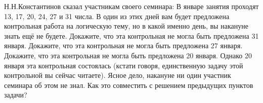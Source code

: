 \documentclass[12pt]{article}
\begin{document}
Н.Н.Константинов сказал участникам своего %
семинара:  В январе занятия %
проходят 13, 17, 20, 24, 27 и 31 числа. В один из этих дней
вам будет предложена %
контрольная работа на логическую тему, но в какой
именно день, вы накануне знать ещё не будете.
Докажите, что эта контрольная не могла быть предложена 31 января.
Докажите, что эта контрольная не могла быть предложена 27 января.
Докажите, что эта контрольная не могла быть предложена 20 января.
Однако 20 января эта контрольная состоялась (кстати говоря,
единственную задачу этой контрольной вы сейчас читаете). Ясное
дело, накануне ни один участник семинара об этом не знал. Как это
совместить с решением предыдущих пунктов задачи?

\vfill
{}

\end{document}
